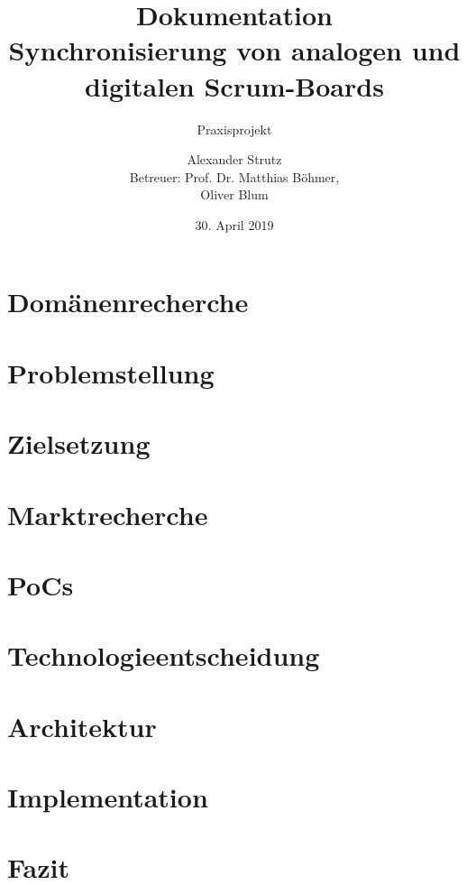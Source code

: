 \documentclass[12pt,titlepage]{scrartcl}
\begin{document}
	\begin{titlepage}
		\title{Dokumentation \\ \glqq Synchronisierung von analogen und digitalen Scrum-Boards\grqq{}} 
		\subtitle{Praxisprojekt}
		\author{Alexander Strutz \vspace{0.5cm}\\ Betreuer: 
		Prof. Dr. Matthias Böhmer,\\Oliver Blum}
 		\date{30. April 2019}
		\maketitle
	\end{titlepage}
	
	\tableofcontents
	
	\newpage
	
	\section{Domänenrecherche}
	 \cite{manifest}
	\newpage
	\section{Problemstellung}
	\newpage	
	\section{Zielsetzung}
	\newpage	
	\section{Marktrecherche}
	\newpage	
	\section{PoCs}
	\newpage	
	\section{Technologieentscheidung}
	\newpage	
	\section{Architektur}
	\newpage
	\section{Implementation}
	\newpage	
	\section{Fazit}

	

 	
\end{document}
